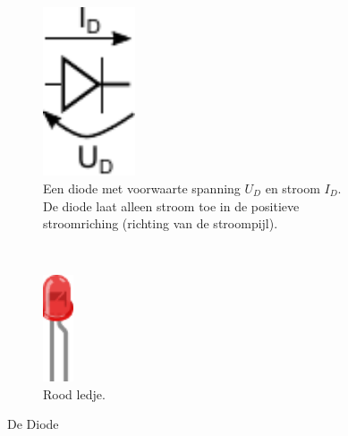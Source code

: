 \documentclass{article}
\begin{document}
			\begin{figure}[htbp]
			\centering
				\begin{subfigure}[b]{0.45\linewidth}
					\centering
					\includegraphics[width=0.3\textwidth]{diode}
					\caption{Een diode met voorwaarte spanning $U_D$ en stroom $I_D$. De diode laat alleen stroom toe in de  positieve stroomriching (richting van de stroompijl).}
					\label{fig:diode}
				\end{subfigure}
				~
				\begin{subfigure}[b]{0.45\linewidth}
					\centering
				\includegraphics[width=0.1\textwidth]{led}
				\caption{Rood ledje.}
				\label{fig:led}
				\end{subfigure}
				\caption{De Diode}
			\end{figure}
\end{document}
